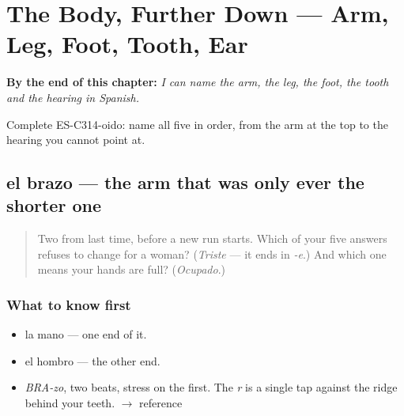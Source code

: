 
\chapter{The Body, Further Down --- Arm, Leg, Foot, Tooth, Ear}
\label{ch:brazo-y-pie}

\begin{chapteropening}
\textbf{By the end of this chapter:} \emph{I can name the arm, the leg, the foot, the tooth and the hearing in Spanish.}

Complete ES-C314-oido: name all five in order, from the arm at the top to the hearing you cannot point at.
\end{chapteropening}

\section[el brazo]{el brazo — the arm that was only ever the shorter one}

\label{lesson:ES-C314-brazo}



\begin{quote}
Two from last time, before a new run starts. Which of your five answers refuses to change for a woman? (\emph{Triste} — it ends in \emph{-e}.) And which one means your hands are full? (\emph{Ocupado}.)
\end{quote}

\subsection*{What to know first}
\begin{itemize}
\raggedright
  \item la mano — one end of it.
  \item el hombro — the other end.
\end{itemize}

\begin{sounds}
\begin{itemize}
\raggedright
  \item \emph{BRA-zo}, two beats, stress on the first. The \emph{r} is a single tap against the ridge behind your teeth. $\to$ reference
\end{itemize}
\end{sounds}

